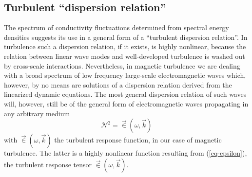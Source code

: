 \documentclass[ ]{copernicus2}
\begin{document}
{%

\subsection{Turbulent ``dispersion relation''}
{The spectrum of conductivity fluctuations determined from spectral energy densities suggests its use in a general form of a ``turbulent dispersion relation''. In turbulence such a dispersion relation, if it exists, is highly nonlinear, because the relation between linear wave modes and well-developed turbulence is washed out by cross-scale interactions. Nevertheless, in magnetic turbulence we are dealing with a broad spectrum of low frequency large-scale electromagnetic waves which, however, by no means are solutions of a dispersion relation derived from the linearized dynamic equations. The most general dispersion relation of such waves will, however, still be of the general form of electromagnetic waves propagating in any arbitrary medium
\begin{equation}
\mathcal{N}^2=\vec{{\in}}(\omega,\vec{k})
\end{equation}
with $\vec{\in}(\omega,\vec{k})$ the turbulent response function, in our case of magnetic turbulence. The latter is a highly nonlinear function resulting from  (\ref{eq-epsilon}), the turbulent response tensor $\vec{\in}(\omega,\vec{k})$. }

}
\end{document}
